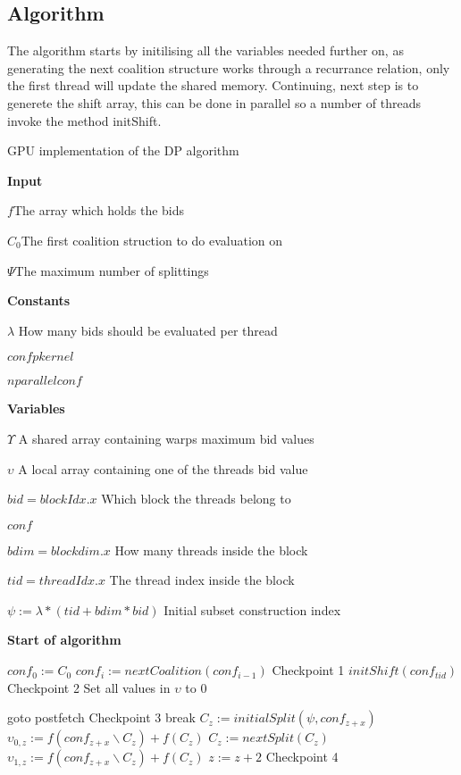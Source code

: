 \documentclass{aamas2012}
\begin{document}
\subsection{Algorithm} %
The algorithm starts by initilising all the variables needed further on,
as generating the next coalition structure works through a recurrance relation, 
only the first thread will update the shared memory. Continuing, next step is to generete the shift array, 
this can be done in parallel so a number of threads invoke the method initShift.
\begin{algorithm}
\caption{GPU implementation of the DP algorithm\label{gpudp}}
\textbf{Input}

$f$\hfill The array which holds the bids

$C_0$\hfill The first coalition struction to do evaluation on

$\Psi$\hfill The maximum number of splittings

\textbf{Constants}

$\lambda$ \hfill How many bids should be evaluated per thread

$confpkernel$

$nparallelconf$

\textbf{Variables} 

$\Upsilon$ \hfill A shared array containing warps maximum bid values

$\upsilon$ \hfill A local array containing one of the threads bid value

$bid = blockIdx.x$ \hfill Which block the threads belong to

$conf$

$bdim = blockdim.x$ \hfill How many threads inside the block

$tid = threadIdx.x$ \hfill The thread index inside the block

$\psi := \lambda*(tid+bdim*bid)$ \hfill Initial subset construction index

\textbf{Start of algorithm}
\begin{algorithmic}[1]
  \STATE $conf_0 := C_0$
    \STATE $conf_i := nextCoalition(conf_{i-1})$
  \ENDFOR \hfill Checkpoint 1
\ENDIF
{}
  \STATE $initShift(conf_{tid})$ 
\ENDIF
\hfill Checkpoint 2
  \STATE Set all values in $\upsilon$ to 0

  \IF{$\psi \geq \Psi$}
    \STATE goto postfetch
  \ENDIF
\hfill Checkpoint 3
      \STATE break
    \ENDIF
    \STATE $C_z := initialSplit(\psi,conf_{z+x})$
    \STATE $\upsilon_{0,z} := f(conf_{z+x}\backslash C_z)+f(C_z)$
    \STATE $C_z := nextSplit(C_z)$
    \STATE $\upsilon_{1,z} := f(conf_{z+x}\backslash C_z)+f(C_z)$
    \STATE $z := z + 2$
  \ENDFOR
\hfill Checkpoint 4
  \label{lst:line:reductionstart}
  

\end{algorithmic}
\end{algorithm}
\end{document}
